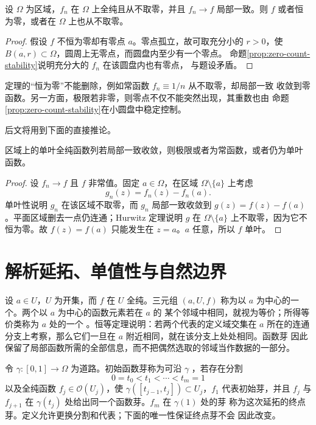 \begin{theorem}[Hurwitz 定理]\label{thm:hurwitz}
设 $\Omega$ 为区域，$f_n$ 在 $\Omega$ 上全纯且从不取零，并且
$f_n\to f$ 局部一致。则 $f$ 或者恒为零，或者在 $\Omega$ 上也从不取零。
\end{theorem}

\begin{proof}
假设 $f$ 不恒为零却有零点 $a$。零点孤立，故可取充分小的 $r>0$，使
$\overline{B(a,r)}\subset\Omega$，圆周上无零点，而圆盘内至少有一个零点。
命题\ref{prop:zero-count-stability}说明充分大的 $f_n$ 在该圆盘内也有零点，
与题设矛盾。
\end{proof}

定理的“恒为零”不能删除，例如常函数 $f_n\equiv1/n$ 从不取零，却局部一致
收敛到零函数。另一方面，极限若非零，则零点不仅不能突然出现，其重数也由
命题\ref{prop:zero-count-stability}在小圆盘中稳定控制。

后文将用到下面的直接推论。

\begin{corollary}[单叶函数的极限]\label{cor:univalent-limit}
区域上的单叶全纯函数列若局部一致收敛，则极限或者为常函数，或者仍为单叶
函数。
\end{corollary}

\begin{proof}
设 $f_n\to f$ 且 $f$ 非常值。固定 $a\in\Omega$，在区域
$\Omega\setminus\{a\}$ 上考虑
\[
 g_n(z)=f_n(z)-f_n(a).
\]
单叶性说明 $g_n$ 在该区域不取零，而 $g_n$ 局部一致收敛到
$g(z)=f(z)-f(a)$。平面区域删去一点仍连通；Hurwitz 定理说明 $g$ 在
$\Omega\setminus\{a\}$ 上不取零，因为它不恒为零。故
$f(z)=f(a)$ 只能发生在 $z=a$。$a$ 任意，所以 $f$ 单叶。
\end{proof}

\section{解析延拓、单值性与自然边界}

设 $a\in U$，$U$ 为开集，而 $f$ 在 $U$ 全纯。三元组 $(a,U,f)$ 称为以
$a$ 为中心的一个。两个以 $a$ 为中心的函数元素若在 $a$ 的
某个邻域中相同，就视为等价；所得等价类称为 $a$ 处的一个
。恒等定理说明：若两个代表的定义域交集在 $a$ 所在的连通
分支上考察，那么它们一旦在 $a$ 附近相同，就在该分支上处处相同。函数芽
因此保留了局部函数所需的全部信息，而不把偶然选取的邻域当作数据的一部分。

令 $\gamma:[0,1]\to\Omega$ 为道路。初始函数芽称为可沿 $\gamma$
，若存在分割
\[
 0=t_0<t_1<\cdots<t_m=1
\]
以及全纯函数 $f_j\in\mathcal O(U_j)$，使
$\gamma([t_{j-1},t_j])\subset U_j$，$f_1$ 代表初始芽，并且 $f_j$ 与
$f_{j+1}$ 在 $\gamma(t_j)$ 处给出同一个函数芽。$f_m$ 在 $\gamma(1)$ 处的芽
称为这次延拓的终点芽。定义允许更换分割和代表；下面的唯一性保证终点芽不会
因此改变。

